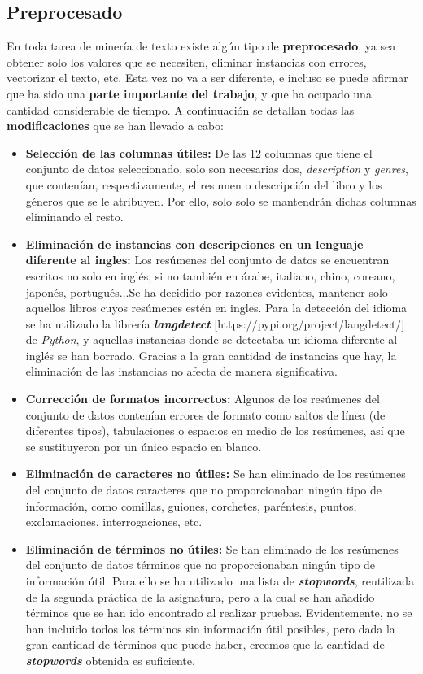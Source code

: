 \documentclass[12pt,a4paper, xcolor=table]{article}
\begin{document}
    \subsection{Preprocesado}
        En toda tarea de minería de texto existe algún tipo de \textbf{preprocesado}, ya sea obtener solo los valores que se necesiten, eliminar instancias con errores, vectorizar el texto, etc. Esta vez no va a ser diferente, e incluso se puede afirmar que ha sido una \textbf{parte importante del trabajo}, y que ha ocupado una cantidad considerable de tiempo. A continuación se detallan todas las \textbf{modificaciones} que se han llevado a cabo:

        \begin{itemize}
            \item \textbf{Selección de las columnas útiles:} De las 12 columnas que tiene el conjunto de datos seleccionado, solo son necesarias dos, \textit{description} y \textit{genres}, que contenían, respectivamente, el resumen o descripción del libro y los géneros que se le atribuyen. Por ello, solo solo se mantendrán dichas columnas eliminando el resto.
            \item \textbf{Eliminación de instancias con descripciones en un lenguaje diferente al ingles:} Los resúmenes del conjunto de datos se encuentran escritos no solo en inglés, si no también en árabe, italiano, chino, coreano, japonés, portugués...Se ha decidido por razones evidentes, mantener solo aquellos libros cuyos resúmenes estén en ingles. Para la detección del idioma se ha utilizado la librería \textit{\textbf{langdetect}} [https://pypi.org/project/langdetect/] de \textit{Python}, y aquellas instancias donde se detectaba un idioma diferente al inglés se han borrado. Gracias a la gran cantidad de instancias que hay, la eliminación de las instancias no afecta de manera significativa.
            \item \textbf{Corrección de formatos incorrectos:} Algunos de los resúmenes del conjunto de datos contenían errores de formato como saltos de línea (de diferentes tipos), tabulaciones o espacios en medio de los resúmenes, así que se sustituyeron por un único espacio en blanco.
            \item \textbf{Eliminación de caracteres no útiles:} Se han eliminado de los resúmenes del conjunto de datos caracteres que no proporcionaban ningún tipo de información, como comillas, guiones, corchetes, paréntesis, puntos, exclamaciones, interrogaciones, etc.
            \item \textbf{Eliminación de términos no útiles:} Se han eliminado de los resúmenes del conjunto de datos términos que no proporcionaban ningún tipo de información útil. Para ello se ha utilizado una lista de \textit{\textbf{stopwords}}, reutilizada de la segunda práctica de la asignatura, pero a la cual se han añadido términos que se han ido encontrado al realizar pruebas. Evidentemente, no se han incluido todos los términos sin información útil posibles, pero dada la gran cantidad de términos que puede haber, creemos que la cantidad de \textit{\textbf{stopwords}} obtenida es suficiente.

\end{itemize}
\end{document}
